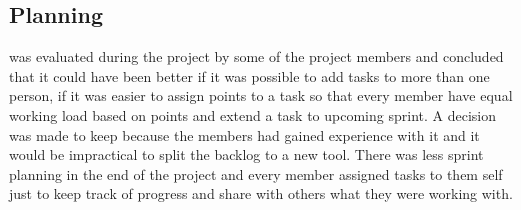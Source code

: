 \subsection{Planning}
\taiga{} was evaluated during the project by some of the project members and concluded that it could have been better if it was possible to add tasks to more than one person, if it was easier to assign points to a task so that every member have equal working load based on points and extend a task to upcoming sprint. A decision was made to keep \taiga{} because the members had gained experience with it and it would be impractical to split the backlog to a new tool. There was less sprint planning in the end of the project and every member assigned tasks to them self just to keep track of progress and share with others what they were working with.

